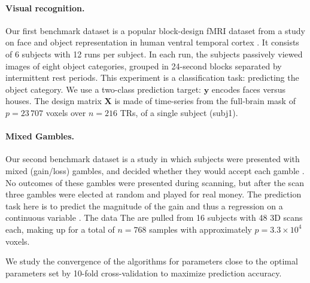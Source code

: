 \paragraph{Visual recognition.}
\label{subsec:haxby}
Our first benchmark dataset is a popular block-design fMRI dataset from a study on face and
object representation in human ventral temporal cortex  \citep{haxby2001}.
It consists of
6 subjects with 12 runs per subject. In each run, the subjects
passively viewed images of eight object categories, grouped
in 24-second blocks separated by intermittent rest periods. This
experiment is a classification task: predicting the object category. We use a
two-class prediction target: $\mathbf{y}$ encodes faces versus houses.
The design matrix $\mathbf{X}$ is made of
time-series from the full-brain mask of $p = 23\,707$ voxels over $n =
216$ TRs, of a single subject (subj1).

\paragraph{Mixed Gambles.}
Our second benchmark dataset is a study in which
subjects were presented with mixed (gain/loss) gambles, and decided
whether they would accept each gamble \citep{mixedgambles2007}.  No outcomes of these gambles
were presented during scanning, but after the scan three gambles were
elected at random and played for real money. The prediction task here is
to predict the magnitude of the gain and thus a regression on a
continuous variable \citep{jimura2012}. The data
The are pulled from 16 subjects with 48 3D scans each, making up for a total of $n=768$ samples with approximately $p=3.3 \times 10^4$ voxels.

\smallskip

We study the convergence of the algorithms for parameters close to the
optimal parameters set by 10-fold cross-validation to maximize prediction
accuracy.

